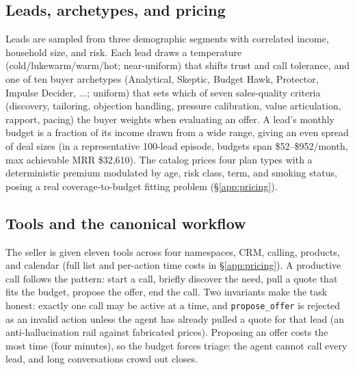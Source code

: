 \documentclass{article} %
\newcommand{\tool}[1]{\texttt{#1}}
\begin{document}
\subsection{Leads, archetypes, and pricing}
\label{sec:leads}
Leads are sampled from three demographic segments with correlated income, household size, and risk. Each lead
draws a temperature (cold/lukewarm/warm/hot; near-uniform) that shifts trust and call tolerance, and one of ten
buyer archetypes (Analytical, Skeptic, Budget Hawk, Protector, Impulse Decider, $\dots$; uniform) that sets which
of seven sales-quality criteria (discovery, tailoring, objection handling, pressure calibration, value
articulation, rapport, pacing) the buyer weights when evaluating an offer. A lead's monthly budget is a fraction
of its income drawn from a wide range, giving an even spread of deal sizes (in a representative 100-lead episode,
budgets span \$52--\$952/month, max achievable MRR \$32{,}610). The catalog prices four plan types with a
deterministic premium modulated by age, risk class, term, and smoking status, posing a real coverage-to-budget
fitting problem (\S\ref{app:pricing}).

\subsection{Tools and the canonical workflow}
The seller is given eleven tools across four namespaces, CRM, calling, products, and calendar (full list and
per-action time costs in \S\ref{app:pricing}). A productive call follows the pattern: start a call, briefly
discover the need, pull a quote that fits the budget, propose the offer, end the call. Two invariants make the
task honest: exactly one call may be active at a time, and \tool{propose\_offer} is rejected as an invalid action
unless the agent has already pulled a quote for that lead (an anti-hallucination rail against fabricated prices).
Proposing an offer costs the most time (four minutes), so the budget forces triage: the agent cannot call every
lead, and long conversations crowd out closes.
\end{document}
